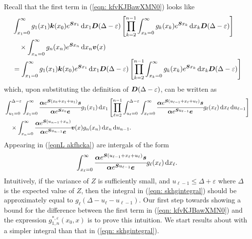 	Recall that the first term in (\ref{eqn: kfvKJBawXMN0}) looks like 
	\begin{align}
		&\int_{x_1=0}^\infty g_1(x_1) \boldsymbol k(x_0)e^{\boldsymbol{S}x_1}\, \mathrm{d} x_1\boldsymbol D(\Delta-\varepsilon)
				\left[\prod_{k=2}^{n-1}\int_{x_k=0}^\infty g_k(x_k) e^{\boldsymbol{S}x_k} \, \mathrm{d} x_k \boldsymbol D(\Delta-\varepsilon)\right] \nonumber 
				\\&\quad \times\int_{x_n=0}^\infty g_{n}(x_n) e^{\boldsymbol{S}x_n} \, \mathrm{d} x_n {\boldsymbol v}(x)  
		\\&=\int_{x_1=0}^\infty g_1(x_1) \boldsymbol k(x_0)e^{\boldsymbol{S}x_1}\, \mathrm{d} x_1\boldsymbol D(\Delta-\varepsilon)
		\left[\prod_{k=2}^{n-1}\int_{x_k=0}^\infty g_k(x_k) e^{\boldsymbol{S}x_k} \, \mathrm{d} x_k \boldsymbol D(\Delta-\varepsilon)\right] \nonumber 
	\end{align}
	which, upon substituting the definition of \(\boldsymbol D(\Delta-\varepsilon)\), can be written as 
	\begin{align}
		& \int_{u_1=0}^{\Delta-\varepsilon} \int_{x_1=0}^\infty \cfrac{\boldsymbol \alpha e^{\boldsymbol{S}(x_{0}+x_1+u_1)}\boldsymbol s}{\boldsymbol \alpha e^{\boldsymbol{S}x_0}\boldsymbol e}g_1(x_1) \, \mathrm{d} x_1 \nonumber 
		\left[\prod_{\ell=2}^{n-1}\int_{u_\ell=0}^{\Delta-\varepsilon} \int_{x_\ell=0}^\infty \cfrac{\boldsymbol \alpha e^{\boldsymbol{S}(u_{\ell-1}+x_\ell+u_\ell)}\boldsymbol s}{\boldsymbol \alpha e^{\boldsymbol{S}u_{\ell-1}}\boldsymbol e}g_\ell(x_\ell) \, \mathrm{d} x_\ell \, \mathrm{d} u_{\ell-1} \right]
            	\\&{}\quad\times\int_{x_n=0}^\infty \cfrac{\boldsymbol \alpha e^{\boldsymbol{S}(u_{n-1}+x_n )}}{\boldsymbol \alpha e^{\boldsymbol{S}u_{n-1}}\boldsymbol e} {\boldsymbol v}(x)g_{n}(x_n)\, \mathrm{d} x_n \, \mathrm{d} u_{n-1} .\label{eqnL akfhcka}
	\end{align}
	Appearing in (\ref{eqnL akfhcka}) are intergals of the form
	\begin{align}
		\int_{x_\ell=0}^\infty \cfrac{\boldsymbol \alpha e^{\boldsymbol{S}(u_{\ell-1}+x_\ell+u_\ell)}\boldsymbol s}{\boldsymbol \alpha e^{\boldsymbol{S}u_{\ell-1}}\boldsymbol e}g_\ell(x_\ell) \, \mathrm{d} x_\ell. \label{eqn: skhgintegral}
	\end{align}
	Intuitively, if the variance of \(Z\) is sufficiently small, and \(u_{\ell-1}\leq \Delta +\varepsilon\) where \(\Delta\) is the expected value of \(Z\), then the integral in (\ref{eqn: skhgintegral}) should be approximately equal to \(g_{\ell}(\Delta - u_{\ell}-u_{\ell-1})\). Our first step towards showing a bound for the difference between the first term in (\ref{eqn: kfvKJBawXMN0}) and the expression \(g^{*,\varepsilon}_{1,n}(x_0,x)\) is to prove this intuition. We start results about with a simpler integral than that in (\ref{eqn: skhgintegral}).


